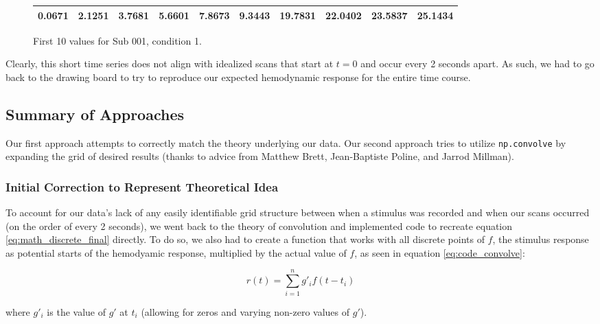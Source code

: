 \vspace{5mm}

\begin{figure}[ht]
\begin{center}
\begin{tabular}{|cccccccccc|}
  \hline
0.0671 &
2.1251 &
3.7681 &
5.6601 &
7.8673 &
9.3443 &
19.7831 &
22.0402 &
23.5837 &
25.1434 \\
 \hline

  \end{tabular}
   \caption{First 10 values for Sub 001, condition 1.}
  \label{table:cond1}
\end{center}
\end{figure}
 
Clearly, this short time series does not align with idealized scans that 
start at $t=0$ and occur every 2 seconds apart. As such, we had to go back 
to the drawing board to try to reproduce our expected hemodynamic response for 
the entire time course.


\subsection{Summary of Approaches}
Our first approach attempts to correctly match the theory underlying our data. 
Our second approach tries to utilize \texttt{np.convolve} by expanding the 
grid of desired results (thanks to advice from  Matthew Brett, Jean-Baptiste Poline,
and Jarrod Millman).


\subsubsection{Initial Correction to Represent Theoretical Idea}
To account for our data's lack of any easily identifiable grid structure 
between when a stimulus was recorded and when our scans occurred (on the 
order of every 2 seconds), we went back to the theory of convolution and 
implemented code to recreate equation \ref{eq:math_discrete_final} directly. 
To do so, we also had to create a function that works with all discrete points 
of $f$, the stimulus response as potential starts of the hemodyamic response, 
multiplied by the actual value of $f$, as seen in equation 
\ref{eq:code_convolve}:

\begin{equation} \label{eq:code_convolve}
r(t)= \sum_{i=1}^n g'_{i} f(t-t_i)
\end{equation}

where $g'_{i}$ is the value of $g'$ at $t_i$ (allowing for zeros and varying 
non-zero values of $g'$).


